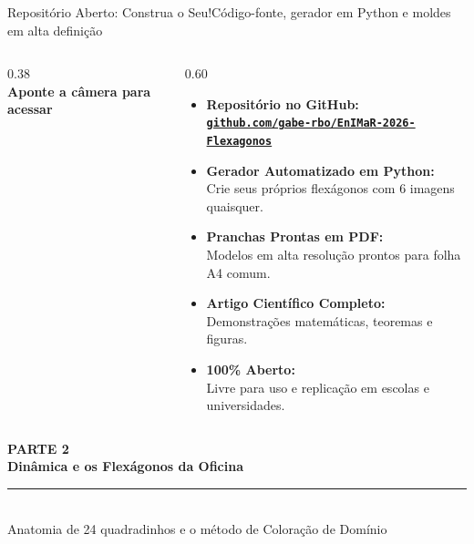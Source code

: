 \documentclass[aspectratio=169, 11pt, utf8]{beamer}
\newcommand{\capaparte}[3]{%
  \begin{frame}[plain]
    \begin{center}
      \vspace{1.2cm}
      {\scriptsize\bfseries\color{EnimarTeal} PARTE #1}\\[0.35cm]
      {\LARGE\bfseries\color{EnimarNavy} #2}\\[0.3cm]
      {\color{EnimarTeal!40}\rule{4.5cm}{0.8pt}}\\[0.45cm]
      {\normalsize\color{EnimarText} #3}
    \end{center}
  \end{frame}
}
\begin{document}
\begin{frame}{Repositório Aberto: Construa o Seu!}{Código-fonte, gerador em Python e moldes em alta definição}
  \begin{columns}[c, onlytextwidth]
    \begin{column}{0.38\textwidth}
      \centering
      \\[5pt]
      {\small \textbf{Aponte a câmera para acessar}}
    \end{column}

    \begin{column}{0.60\textwidth}
      \small
      \begin{itemize}
        \setlength{\itemsep}{2pt}
        \item \textbf{Repositório no GitHub:}\\
        {\footnotesize\href{https://github.com/gabe-rbo/EnIMaR-2026-Flexagonos}{\color{EnimarNavy}\texttt{\textbf{github.com/gabe-rbo/EnIMaR-2026-Flexagonos}}}}

        \item \textbf{Gerador Automatizado em Python:}\\
        Crie seus próprios flexágonos com 6 imagens quaisquer.

        \item \textbf{Pranchas Prontas em PDF:}\\
        Modelos em alta resolução prontos para folha A4 comum.

        \item \textbf{Artigo Científico Completo:}\\
        Demonstrações matemáticas, teoremas e figuras.

        \item \textbf{100\% Aberto:}\\
        Livre para uso e replicação em escolas e universidades.
      \end{itemize}
    \end{column}
  \end{columns}
\end{frame}

\capaparte{2}{Dinâmica e os Flexágonos da Oficina}{Anatomia de 24 quadradinhos e o método de Coloração de Domínio}
\end{document}
